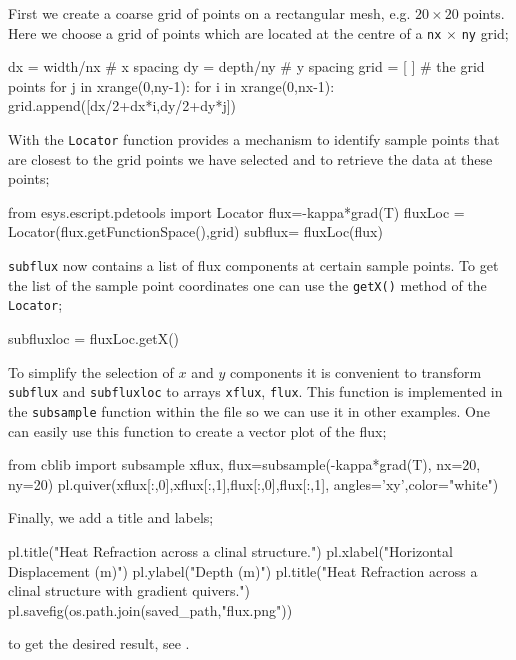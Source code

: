 First we create a coarse grid of points on a rectangular mesh, e.g. $20 \times
20$ points. Here we choose a grid of points which are located at the centre of
a \verb|nx| $\times$ \verb|ny| grid;
\begin{python}
dx = width/nx # x spacing
dy = depth/ny # y spacing
grid = [ ] # the grid points
for j in xrange(0,ny-1):
    for i in xrange(0,nx-1):
           grid.append([dx/2+dx*i,dy/2+dy*j])
\end{python}
With the \verb|Locator| function \esc provides a mechanism to identify sample
points that are closest to the grid points we have selected and to retrieve the
data at these points; 
\begin{python}
from esys.escript.pdetools import Locator
flux=-kappa*grad(T)
fluxLoc = Locator(flux.getFunctionSpace(),grid)
subflux= fluxLoc(flux) 
\end{python}
\verb|subflux| now contains a list of flux components at certain sample points.
To get the list of the sample point coordinates one can use the \verb|getX()|
method of the \verb|Locator|;
\begin{python}
subfluxloc = fluxLoc.getX()
\end{python}
To simplify the selection of $x$ and $y$ components it is convenient to
transform \verb|subflux| and \verb|subfluxloc| to \numpy arrays
\verb|xflux|, \verb|flux|.
This function is implemented in the \verb|subsample| function within the
 file so we can use it in other examples. One can easily use this
function to create a vector plot of the flux;
\begin{python}
from cblib import subsample
xflux, flux=subsample(-kappa*grad(T), nx=20, ny=20)
pl.quiver(xflux[:,0],xflux[:,1],flux[:,0],flux[:,1], angles='xy',color="white")
\end{python}
Finally, we add a title and labels;
\begin{python}
pl.title("Heat Refraction across a clinal structure.")
pl.xlabel("Horizontal Displacement (m)")
pl.ylabel("Depth (m)")
pl.title("Heat Refraction across a clinal structure \n with gradient quivers.")
pl.savefig(os.path.join(saved_path,"flux.png"))
\end{python} 
to get the desired result, see .

